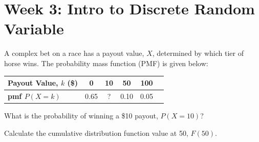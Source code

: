 \documentclass[a4paper, 10pt]{article}
\begin{document}
\subject[2110205 - Statistics for Computer Engineering]

\section{Week 3: Intro to Discrete Random Variable}

\begin{problem}
A complex bet on a race has a payout value, \( X \), determined by which tier
of horse wins. The probability mass function (PMF) is given below:
\par\noindent
\begin{table}[h]
	\centering
	\renewcommand{\arraystretch}{1.5}
	\begin{tabular}{|l|c|c|c|c|c|}
		\hline
		\textbf{Payout Value, \( k \) (\$)} & 0    & 10 & 50   & 100  \\
		\hline
		\textbf{pmf \( P(X = k) \)}         & 0.65 & ?  & 0.10 & 0.05 \\
		\hline
	\end{tabular}
	\label{tab:hw03-pb01}
\end{table}

\begin{subproblems_alpha}
	\item What is the probability of winning a \$10 payout, \( P(X = 10) \)?
	\item Calculate the cumulative distribution function value at 50, \( F(50) \).
\end{subproblems_alpha}
\end{problem}
\end{document}
